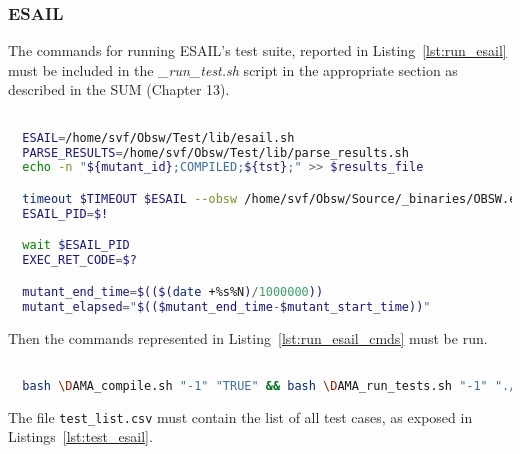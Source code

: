 \subsubsection{ESAIL}

The commands for running ESAIL's test suite, reported in Listing~\ref{lst:run_esail} must be included in the \emph{\DAMA\_run\_test.sh} script in the appropriate section as described in the SUM (Chapter 13).


  \begin{lstlisting}[language=bash, label={lst:run_esail}]

  ESAIL=/home/svf/Obsw/Test/lib/esail.sh
  PARSE_RESULTS=/home/svf/Obsw/Test/lib/parse_results.sh
  echo -n "${mutant_id};COMPILED;${tst};" >> $results_file

  timeout $TIMEOUT $ESAIL --obsw /home/svf/Obsw/Source/_binaries/OBSW.exe --fast -n -c --source /home/svf/Obsw/Source --version 04010000 -t $tst &
  ESAIL_PID=$!

  wait $ESAIL_PID
  EXEC_RET_CODE=$?

  mutant_end_time=$(($(date +%s%N)/1000000))
  mutant_elapsed="$(($mutant_end_time-$mutant_start_time))"

  \end{lstlisting}

Then the commands represented in Listing~\ref{lst:run_esail_cmds} must be run.

  \begin{lstlisting}[language=bash, label={lst:run_esail_cmds}]

  bash \DAMA_compile.sh "-1" "TRUE" && bash \DAMA_run_tests.sh "-1" "./test_list.csv" "./"

  \end{lstlisting}

The file \texttt{test\_list.csv} must contain the list of all test cases, as exposed in Listings~\ref{lst:test_esail}.

